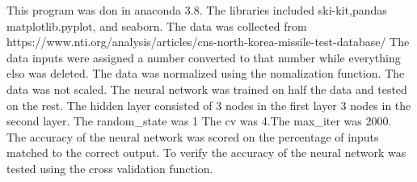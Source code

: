 This program was don in anaconda 3.8. The libraries included ski-kit,pandas
matplotlib.pyplot, and seaborn. The data was collected from https://www.nti.org/analysis/articles/cns-north-korea-missile-test-database/
The data inputs were assigned a number converted to that number while everything elso was deleted.
The data was normalized using the nomalization function. The data was not scaled. The neural network was trained on half the data and tested 
on the rest. The hidden layer consisted of 3 nodes in the first layer 3 nodes in the second layer. The random_state was 1
The cv was 4.The max_iter was 2000. The accuracy of the neural network was scored on the percentage of inputs matched to the correct output.
To verify the accuracy of the neural network was tested using the cross validation function.
